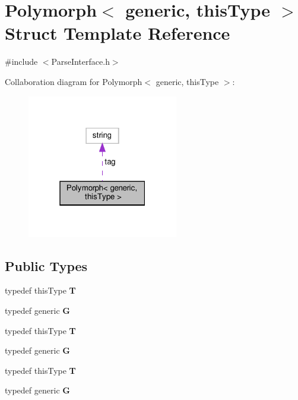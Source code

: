 \hypertarget{structPolymorph}{}\section{Polymorph$<$ generic, this\+Type $>$ Struct Template Reference}
\label{structPolymorph}


{\ttfamily \#include $<$Parse\+Interface.\+h$>$}



Collaboration diagram for Polymorph$<$ generic, this\+Type $>$\+:
\nopagebreak
\begin{figure}[H]
\begin{center}
\leavevmode
\includegraphics[width=187pt]{structPolymorph__coll__graph}
\end{center}
\end{figure}
\subsection*{Public Types}
\begin{DoxyCompactItemize}
\item 
\mbox{\label{structPolymorph_a0d3d028703a1f6a992243ec98a1fd329}} 
typedef this\+Type {\bfseries T}
\item 
\mbox{\label{structPolymorph_ac1e1e1e20170b395bcd53fa5eb2e029a}} 
typedef generic {\bfseries G}
\item 
\mbox{\label{structPolymorph_a0d3d028703a1f6a992243ec98a1fd329}} 
typedef this\+Type {\bfseries T}
\item 
\mbox{\label{structPolymorph_ac1e1e1e20170b395bcd53fa5eb2e029a}} 
typedef generic {\bfseries G}
\item 
\mbox{\label{structPolymorph_a0d3d028703a1f6a992243ec98a1fd329}} 
typedef this\+Type {\bfseries T}
\item 
\mbox{\label{structPolymorph_ac1e1e1e20170b395bcd53fa5eb2e029a}} 
typedef generic {\bfseries G}
\end{DoxyCompactItemize}
